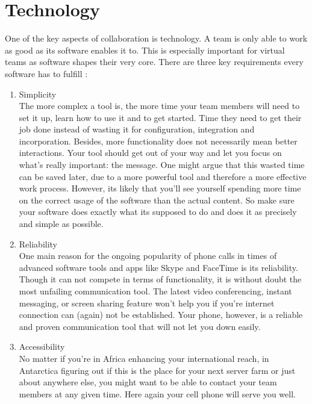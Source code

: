 \section{Technology}
\begin{multicols}{2}
One of the key aspects of collaboration is technology. A team is only able to work as good as its software enables it to. This is especially important for virtual teams as software shapes their very core.
There are three key requirements every software has to fulfill \cite{HBR}:

\begin{enumerate}[1.]

	\item Simplicity\\
The more complex a tool is, the more time your team members will need to set it up, learn how to use it and to get started. Time they need to get their job done instead of wasting it  for configuration, integration and incorporation. Besides, more functionality does not necessarily mean better interactions. Your tool should get out of your way and let you focus on what’s really important: the message. One might argue that this wasted time can be saved later, due to a more powerful tool and therefore a more effective work process. However, its likely that you’ll see yourself spending more time on the correct usage of the software than the actual content. So make sure your software does exactly what its supposed to do and does it as precisely and simple as possible.

	\item Reliability\\
One main reason for the ongoing popularity of phone calls in times of advanced software tools and apps like Skype and FaceTime is its reliability. Though it can not compete in terms of functionality, it is without doubt the most unfailing communication tool. The latest video conferencing, instant messaging, or screen sharing feature won’t help you if you’re internet connection can (again) not be established.
Your phone, however, is a reliable and proven communication tool that will not let you down easily.

	\item Accessibility\\
No matter if you’re in Africa enhancing your international reach, in Antarctica figuring out if this is the place for your next server farm or just about anywhere else, you might want to be able to contact your team members at any given time.  Here again your cell phone will serve you well.
\end{enumerate}
\end{multicols}